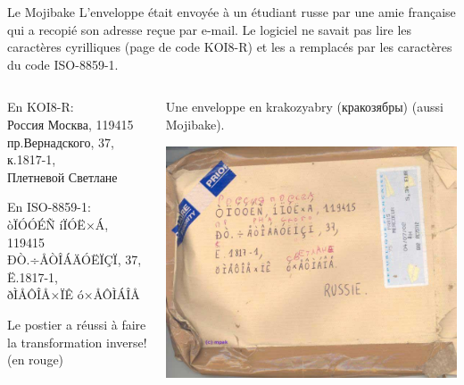 \begin{frame}[fragile]{Le Mojibake}
  L'enveloppe était envoyée à un étudiant russe par une amie
  française qui a recopié son adresse reçue par e-mail. Le logiciel ne
  savait pas lire les caractères cyrilliques (page de code KOI8-R) et
  les a remplacés par les caractères du code ISO-8859-1.
  \begin{columns}
    \begin{column}{0.35\linewidth}
      \centering
      En KOI8-R:\\{
        \selectfont
        Россия Москва, 119415\\
        пр.Вернадского, 37,\\
        к.1817-1,\\
        Плетневой Светлане}
      
      \par
      \bigskip

      En ISO-8859-1:\\
      òÏÓÓÉÑ íÏÓË×Á, 119415\\
      ÐÒ.÷ÅÒÎÁÄÓËÏÇÏ, 37,\\
      Ë.1817-1,\\
      ðÌÅÔÎÅ×ÏÊ ó×ÅÔÌÁÎÅ

      \par
      \bigskip

      Le postier a réussi à faire la transformation inverse! (en rouge)

    \end{column}
    \begin{column}{0.65\linewidth}
      \centering

      \small Une enveloppe en krakozyabry
      ({\selectfont кракозябры}) (aussi
      Mojibake). 

      \includegraphics[width=\linewidth]{img/04/mojibake.jpg}
    \end{column}
  \end{columns}
\end{frame}
